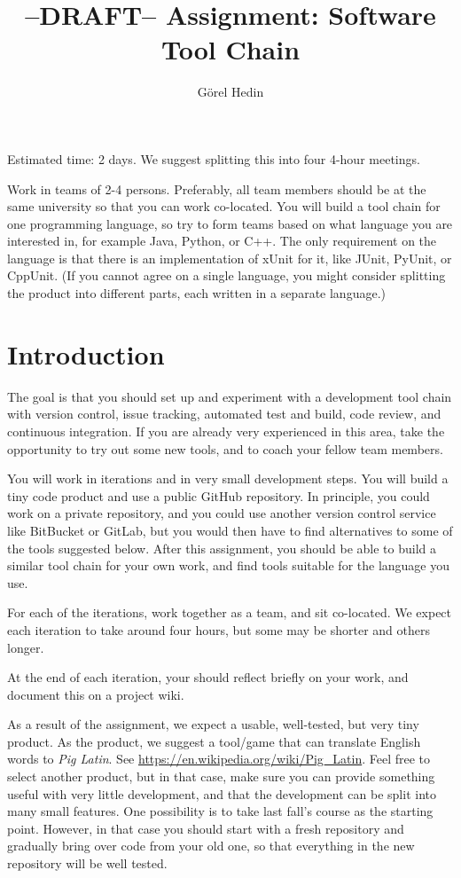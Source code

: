 \documentclass[swedish,english]{article}
\author{G{\"o}rel Hedin}
\title{--DRAFT-- Assignment: Software Tool Chain}
\begin{document}

Estimated time: 2 days. We suggest splitting this into four 4-hour meetings.

Work in teams of 2-4 persons. Preferably, all team members should be at the same university so that you can work co-located. You will build a tool chain for one programming language, so try to form teams based on what language you are interested in, for example Java, Python, or C++. The only requirement on the language is that there is an implementation of xUnit for it, like JUnit, PyUnit, or CppUnit. (If you cannot agree on a single language, you might consider splitting the product into different parts, each written in a separate language.)

\section*{Introduction}

The goal is that you should set up and experiment with a development tool chain with version control, issue tracking, automated test and build, code review, and continuous integration. If you are already very experienced in this area, take the opportunity to try out some new tools, and to coach your fellow team members.

You will work in iterations and in very small development steps. You will build a tiny code product and use a public GitHub repository. In principle, you could work on a private repository, and you could use another version control service like BitBucket or GitLab, but you would then have to find alternatives to some of the tools suggested below. After this assignment, you should be able to build a similar tool chain for your own work, and find tools suitable for the language you use. 

For each of the iterations, work together as a team, and sit co-located. We expect each iteration to take around four hours, but some may be shorter and others longer.

At the end of each iteration, your should reflect briefly on your work, and document this on a project wiki. 

As a result of the assignment, we expect a usable, well-tested, but very tiny product. As the product, we suggest a tool/game that can translate English words to \emph{Pig Latin}. See \url{https://en.wikipedia.org/wiki/Pig_Latin}. Feel free to select another product, but in that case, make sure you can provide something useful with very little development, and that the development can be split into many small features. One possibility is to take last fall's course as the starting point. However, in that case you should start with a fresh repository and gradually bring over code from your old one, so that everything in the new repository will be well tested.
\end{document}
